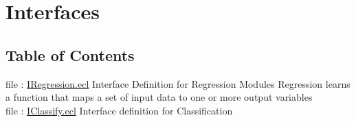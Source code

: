 \chapter*{Interfaces}
\hypertarget{ML_Core/Interfaces}{}


\section*{Table of Contents}
file : \hyperlink{ML_Core.Interfaces.IRegression}{IRegression.ecl}  Interface Definition for Regression Modules Regression learns a function that maps a set of input data to one or more output variables \\
file : \hyperlink{ML_Core.Interfaces.IClassify}{IClassify.ecl}  Interface definition for Classification \\



